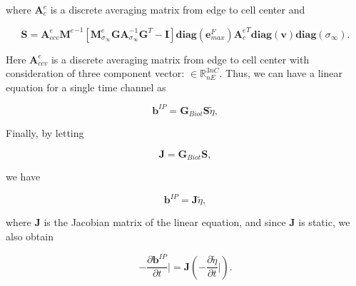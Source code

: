 \documentclass[extra,mreferee]{gji}
\newcommand{\siginf}{\sigma_\infty}
\newcommand{\Ace}{{\mathbf A_c^e}}
\newcommand{\diag}{\mathbf{diag}}
\newcommand{\M}{{\mathbf M}}
\newcommand{\MeSigInf}{{\M^e_{\sigma_\infty}}}
\newcommand{\Me}{{\M^e}}
\newcommand {\db}  { {\mathbf{b} } }
\newcommand {\de}  { {\mathbf{e} } }
\newcommand{\vol}{\mathbf{v}}
\newcommand{\A}{\mathbf{A}}
\newcommand{\Gbiot}{\mathbf{G}_{Biot}}
\newcommand{\peta}{\tilde{\eta}}
\begin{document}
where $\mathbf{A}^{e}_{c}$ is a discrete averaging matrix from edge to cell center and 
\begin{linenomath*}
\begin{equation}
  \mathbf{S} = \mathbf{A}^{e}_{ccv}\Me^{-1}[\MeSigInf \mathbf{G} \A_{\siginf}^{-1}\mathbf{G}^T  - \mathbf{I}] \diag(\de^{F}_{max})\Ace^T\diag(\vol)\diag(\siginf).
\end{equation}
\end{linenomath*}
Here $\mathbf{A}^{e}_{ccv}$ is a discrete averaging matrix from edge to cell center with consideration of three component vector: $\in \mathbb{R}^{3nC}_{nE}$. 
Thus, we can have a linear equation for a single time channel as
\begin{linenomath*}
\begin{equation*}
  \db^{IP} = \Gbiot \mathbf{S} \peta,
\end{equation*}
\end{linenomath*}
Finally, by letting
\begin{linenomath*}
\begin{equation}
  \mathbf{J} = \Gbiot\mathbf{S},
  \label{eq: Sense}
\end{equation}
\end{linenomath*}
we have
\begin{linenomath*}
\begin{equation}
  \db^{IP} = \mathbf{J}\peta,
  \label{eq: bIP_linear}
\end{equation}
\end{linenomath*}
where $\mathbf{J}$ is the Jacobian matrix of the linear equation, and since $\mathbf{J}$ is static, we also obtain
\begin{linenomath*}
\begin{equation}
  -\frac{\partial\db^{IP}}{\partial t}\Big| = \mathbf{J}(-\frac{\partial \peta}{\partial t}\Big|).
  \label{eq: dbIPdt_linear}
\end{equation}
\end{linenomath*}

\clearpage
\end{document}
